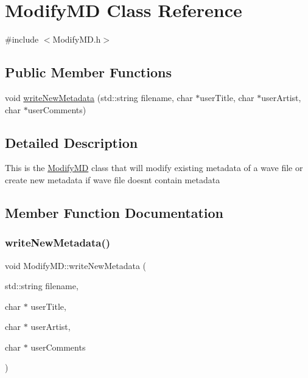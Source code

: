 \hypertarget{classModifyMD}{}\section{Modify\+MD Class Reference}
\label{classModifyMD}


{\ttfamily \#include $<$Modify\+M\+D.\+h$>$}

\subsection*{Public Member Functions}
\begin{DoxyCompactItemize}
\item 
void \hyperlink{classModifyMD_a786302b363edb0be67edd1a409ba7b00}{write\+New\+Metadata} (std\+::string filename, char $\ast$user\+Title, char $\ast$user\+Artist, char $\ast$user\+Comments)
\end{DoxyCompactItemize}


\subsection{Detailed Description}
This is the \hyperlink{classModifyMD}{Modify\+MD} class that will modify existing metadata of a wave file or create new metadata if wave file doesn\textquotesingle{}t contain metadata 

\subsection{Member Function Documentation}
\mbox{\label{classModifyMD_a786302b363edb0be67edd1a409ba7b00}} 
\subsubsection{\texorpdfstring{write\+New\+Metadata()}{writeNewMetadata()}}
{\footnotesize\ttfamily void Modify\+M\+D\+::write\+New\+Metadata (\begin{DoxyParamCaption}\item[{std\+::string}]{filename,  }\item[{char $\ast$}]{user\+Title,  }\item[{char $\ast$}]{user\+Artist,  }\item[{char $\ast$}]{user\+Comments }\end{DoxyParamCaption})}

